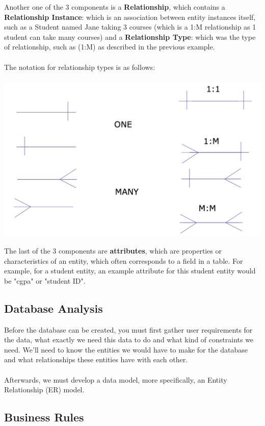 \documentclass[12pt]{article}
\begin{document}
Another one of the 3 components is a \textbf{Relationship}, which contains a \textbf{Relationship Instance}: which is an association between entity instances itself, such as a Student named Jane taking 3 courses (which is a 1:M relationship as 1 student can take many courses) and a \textbf{Relationship Type}: which was the type of relationship, such as (1:M) as described in the previous example.\\
\\
The notation for relationship types is as follows:\\
\\
\includegraphics[scale=0.5]{lec2-2}

The last of the 3 components are \textbf{attributes}, which are properties or characteristics of an entity, which often corresponds to a field in a table. For example, for a student entity, an example attribute for this student entity would be "cgpa" or "student ID".

\subsection{Database Analysis}

Before the database can be created, you must first gather user requirements for the data, what exactly we need this data to do and what kind of constraints we need. We'll need to know the entities we would have to make for the database and what relationships these entities have with each other.\\
\\
Afterwards, we must develop a data model, more specifically, an Entity Relationship (ER) model.

\subsection{Business Rules}
\end{document}
